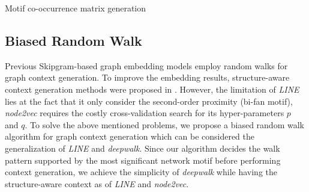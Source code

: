 \documentclass{article}
\theoremstyle{definition}
\begin{document}
\begin{algorithm}[h] \label{al:madj}
\caption{Motif co-occurrence matrix generation}
\end{algorithm}

\subsection{Biased Random Walk}

Previous Skipgram-based graph embedding models employ random
walks for graph context generation. To improve the embedding results,
structure-aware context generation methods were proposed in \cite{line,node2vec}.
However, the limitation of \emph{LINE} lies at the fact that it only
consider the second-order proximity (bi-fan motif),  \emph{node2vec} requires
the costly cross-validation search for its hyper-parameters $p$ and $q$.
To solve the above mentioned problems, we propose a biased random walk
algorithm for graph context generation which can be considered the 
generalization of \emph{LINE} and \emph{deepwalk}. Since our algorithm
decides the walk pattern supported by the most significant network motif before 
performing context generation, we achieve the simplicity of \emph{deepwalk}
while having the structure-aware context as of \emph{LINE} and \emph{node2vec}.
\end{document}
